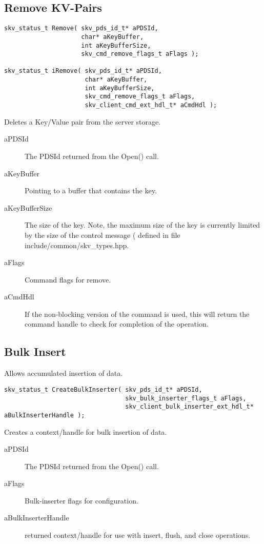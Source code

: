 \subsection{Remove KV-Pairs}\label{sec:api:remove}
\begin{lstlisting}
skv_status_t Remove( skv_pds_id_t* aPDSId,
                     char* aKeyBuffer,
                     int aKeyBufferSize,
                     skv_cmd_remove_flags_t aFlags );

skv_status_t iRemove( skv_pds_id_t* aPDSId,
                      char* aKeyBuffer,
                      int aKeyBufferSize,
                      skv_cmd_remove_flags_t aFlags,
                      skv_client_cmd_ext_hdl_t* aCmdHdl );
\end{lstlisting}
Deletes a Key/Value pair from the server storage.
\begin{description}
\item[aPDSId] The PDSId returned from the Open() call.
\item[aKeyBuffer] Pointing to a buffer that contains the key.
\item[aKeyBufferSize] The size of the key.  Note, the maximum size of
  the key is currently limited by the size of the control message
  ( defined in file
  include/common/skv\_types.hpp.
\item[aFlags] Command flags for remove. 
\item[aCmdHdl] If the non-blocking version of the command is used,
  this will return the command handle to check for completion of the
  operation.
\end{description}


\subsection{Bulk Insert}\label{sec:api:bulkinsert}
Allows accumulated insertion of data.

\begin{lstlisting}
skv_status_t CreateBulkInserter( skv_pds_id_t* aPDSId,
                                 skv_bulk_inserter_flags_t aFlags,
                                 skv_client_bulk_inserter_ext_hdl_t* aBulkInserterHandle );
\end{lstlisting}
Creates a context/handle for bulk insertion of data.
\begin{description}
\item[aPDSId] The PDSId returned from the Open() call.
\item[aFlags] Bulk-inserter flags for configuration.
\item[aBulkInserterHandle] returned context/handle for use with
  insert, flush, and close operations.
\end{description}

